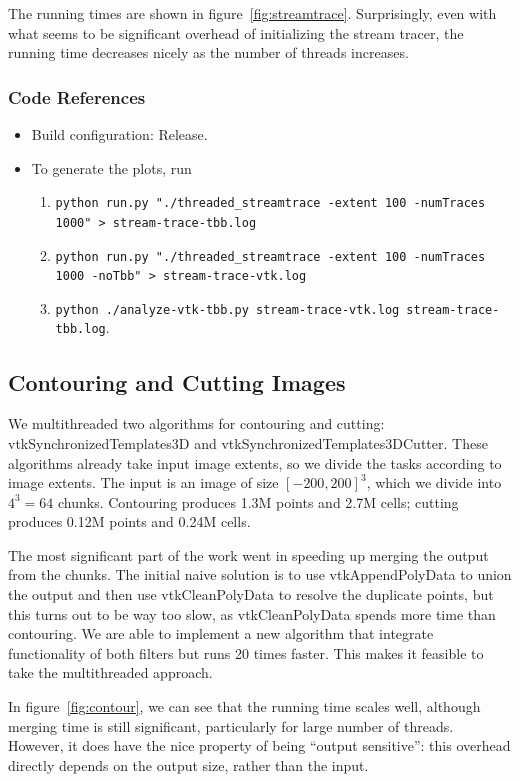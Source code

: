 \documentclass{article}
\begin{document}
The running times are shown in
figure~\ref{fig:streamtrace}. Surprisingly, even with what seems to be
significant overhead of initializing the stream tracer, the running
time decreases nicely as the number of threads increases.

\subsubsection*{Code References}
\begin{itemize}
\item Build configuration: Release.
\item To generate the plots, run
\begin{enumerate}
\item {\tt python run.py "./threaded\_streamtrace -extent 100 -numTraces 1000" > stream-trace-tbb.log}
\item {\tt python run.py "./threaded\_streamtrace -extent 100 -numTraces 1000 -noTbb" > stream-trace-vtk.log}
\item {\tt python ./analyze-vtk-tbb.py stream-trace-vtk.log stream-trace-tbb.log}.
\end{enumerate}
\end{itemize}

\subsection{Contouring and Cutting Images }

We multithreaded two algorithms for contouring and cutting:
vtkSynchronizedTemplates3D and vtkSynchronizedTemplates3DCutter. These
algorithms already take input image extents, so we divide the tasks
according to image extents. The input is an image of size
$[-200,200]^3$, which we divide into $4^3=64$ chunks. Contouring
produces 1.3M points and 2.7M cells; cutting produces 0.12M points and
0.24M cells.

The most significant part of the work went in speeding up merging the
output from the chunks. The initial naive solution is to use
vtkAppendPolyData to union the output and then use vtkCleanPolyData to
resolve the duplicate points, but this turns out to be way too slow,
as vtkCleanPolyData spends more time than contouring. We are able to
implement a new algorithm that integrate functionality of both filters
but runs 20 times faster. This makes it feasible to take the
multithreaded approach.

In figure~\ref{fig:contour}, we can see that the running time scales
well, although merging time is still significant, particularly for
large number of threads. However, it does have the nice property of
being ``output sensitive'': this overhead directly depends on the
output size, rather than the input.
\end{document}
